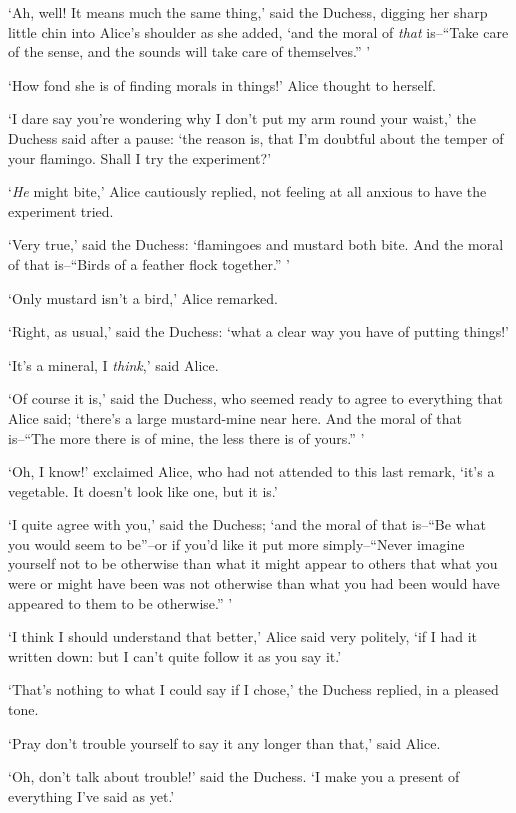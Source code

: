   `Ah, well!  It means much the same thing,' said the Duchess,
digging her sharp little chin into Alice's shoulder as she added,
`and the moral of {\it that} is--``Take care of the sense, and the
sounds will take care of themselves.'' '

  `How fond she is of finding morals in things!' Alice thought to
herself.

  `I dare say you're wondering why I don't put my arm round your
waist,' the Duchess said after a pause:  `the reason is, that I'm
doubtful about the temper of your flamingo.  Shall I try the
experiment?'

  `{\it He} might bite,' Alice cautiously replied, not feeling at all
anxious to have the experiment tried.

  `Very true,' said the Duchess:  `flamingoes and mustard both
bite.  And the moral of that is--``Birds of a feather flock
together.'' '

  `Only mustard isn't a bird,' Alice remarked.

  `Right, as usual,' said the Duchess:  `what a clear way you
have of putting things!'

  `It's a mineral, I {\it think},' said Alice.

  `Of course it is,' said the Duchess, who seemed ready to agree
to everything that Alice said; `there's a large mustard-mine near
here.  And the moral of that is--``The more there is of mine, the
less there is of yours.'' '

  `Oh, I know!' exclaimed Alice, who had not attended to this
last remark, `it's a vegetable.  It doesn't look like one, but it
is.'

  `I quite agree with you,' said the Duchess; `and the moral of
that is--``Be what you would seem to be''--or if you'd like it put
more simply--``Never imagine yourself not to be otherwise than
what it might appear to others that what you were or might have
been was not otherwise than what you had been would have appeared
to them to be otherwise.'' '

  `I think I should understand that better,' Alice said very
politely, `if I had it written down:  but I can't quite follow it
as you say it.'

  `That's nothing to what I could say if I chose,' the Duchess
replied, in a pleased tone.

  `Pray don't trouble yourself to say it any longer than that,'
said Alice.

  `Oh, don't talk about trouble!' said the Duchess.  `I make you
a present of everything I've said as yet.'

